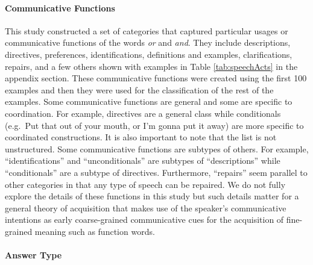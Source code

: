 \documentclass[floatsintext,man]{apa6}
\theoremstyle{definition}
\theoremstyle{definition}
\theoremstyle{definition}
\theoremstyle{remark}
\begin{document}
\paragraph{Communicative Functions}\label{communicative-functions}

This study constructed a set of categories that captured particular
usages or communicative functions of the words \emph{or} and \emph{and}.
They include descriptions, directives, preferences, identifications,
definitions and examples, clarifications, repairs, and a few others
shown with examples in Table \ref{tab:speechActs} in the appendix
section. These communicative functions were created using the first 100
examples and then they were used for the classification of the rest of
the examples. Some communicative functions are general and some are
specific to coordination. For example, directives are a general class
while conditionals (e.g.~Put that out of your mouth, or I'm gonna put it
away) are more specific to coordinated constructions. It is also
important to note that the list is not unstructured. Some communicative
functions are subtypes of others. For example, \enquote{identifications}
and \enquote{unconditionals} are subtypes of \enquote{descriptions}
while \enquote{conditionals} are a subtype of directives. Furthermore,
\enquote{repairs} seem parallel to other categories in that any type of
speech can be repaired. We do not fully explore the details of these
functions in this study but such details matter for a general theory of
acquisition that makes use of the speaker's communicative intentions as
early coarse-grained communicative cues for the acquisition of
fine-grained meaning such as function words.

\paragraph{Answer Type}\label{answer-type}
\end{document}
